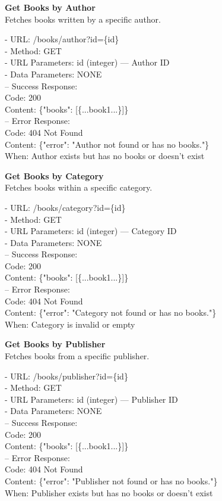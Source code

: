 \begin{flushleft}
    \textbf{Get Books by Author} \\
    Fetches books written by a specific author.

    - URL: /books/author?id=\{id\} \\
    - Method: GET \\
    - URL Parameters: id (integer) — Author ID \\
    - Data Parameters: NONE \\
    – Success Response: \\
    Code: 200 \\
    Content: \{"books": [\{...book1...\}]\} \\
    – Error Response: \\
    Code: 404 Not Found \\
    Content: \{"error": "Author not found or has no books."\} \\
    When: Author exists but has no books or doesn’t exist
\end{flushleft}

\begin{flushleft}
    \textbf{Get Books by Category} \\
    Fetches books within a specific category.

    - URL: /books/category?id=\{id\} \\
    - Method: GET \\
    - URL Parameters: id (integer) — Category ID \\
    - Data Parameters: NONE \\
    – Success Response: \\
    Code: 200 \\
    Content: \{"books": [\{...book1...\}]\} \\
    – Error Response: \\
    Code: 404 Not Found \\
    Content: \{"error": "Category not found or has no books."\} \\
    When: Category is invalid or empty
\end{flushleft}

\begin{flushleft}
    \textbf{Get Books by Publisher} \\
    Fetches books from a specific publisher.

    - URL: /books/publisher?id=\{id\} \\
    - Method: GET \\
    - URL Parameters: id (integer) — Publisher ID \\
    - Data Parameters: NONE \\
    – Success Response: \\
    Code: 200 \\
    Content: \{"books": [\{...book1...\}]\} \\
    – Error Response: \\
    Code: 404 Not Found \\
    Content: \{"error": "Publisher not found or has no books."\} \\
    When: Publisher exists but has no books or doesn’t exist
\end{flushleft}

